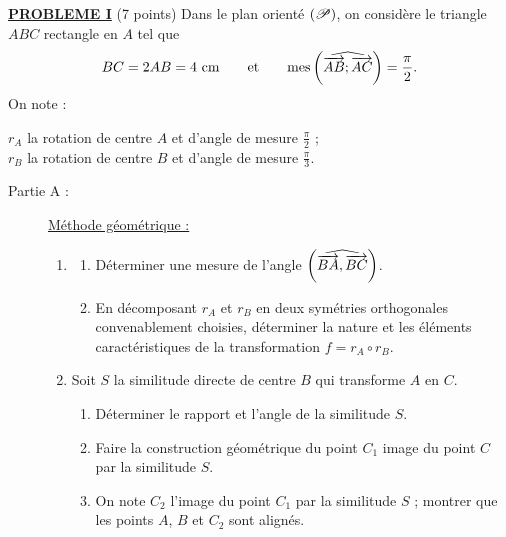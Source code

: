 \noindent \underline{\textsc{\textbf{PROBLEME I}}} (7 points) \newline
      Dans le plan orient\'e $(\mathscr{P})$, on consid\`ere le triangle $ABC$ rectangle en $A$ tel que
      \[
            BC=2AB=4~\mathrm{cm}
            \qquad\text{et}\qquad
            \mathrm{mes}\left( \widehat{ \overrightarrow{AB} ; \overrightarrow{AC} } \right)=\frac{\pi}{2}.
      \]
      On note : 
      \begin{mitanisa}
            $r_A$ la rotation de centre $A$ et d'angle de mesure $\frac{\pi}{2}$ ; \\
            $r_B$ la rotation de centre $B$ et d'angle de mesure $\frac{\pi}{3}$. 
      \end{mitanisa}
      
      \begin{description}
            \item[Partie A :] \underline{M\'ethode g\'eom\'etrique :}
                  \begin{enumerate}
                        \item \begin{enumerate}
                                    \item D\'eterminer une mesure de l'angle $\left( \widehat{ \overrightarrow{BA} , \overrightarrow{BC} } \right)$.
                                    \item En d\'ecomposant $r_A$ et $r_B$ en deux sym\'etries orthogonales convenablement
                                          choisies, d\'eterminer la nature et les \'el\'ements caract\'eristiques de 
                                          la transformation $f = r_A \circ r_B$.
                              \end{enumerate}
                        \item Soit $S$ la similitude directe de centre $B$ qui transforme $A$ en $C$.
                              \begin{enumerate}
                                    \item D\'eterminer le rapport et l'angle de la similitude $S$.
                                    \item Faire la construction g\'eom\'etrique du point $C_1$ image du point $C$ par 
                                          la similitude $S$.
                                    \item On note $C_2$ l'image du point $C_1$ par la similitude $S$ ;
                                          montrer que les points $A$, $B$ et $C_2$ sont align\'es.

\end{enumerate}
\end{enumerate}
\end{description}
